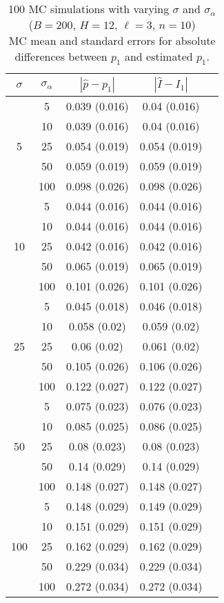 \documentclass[12pt]{article}
\theoremstyle{definition}
\theoremstyle{definition}
\begin{document}
\begin{table}
\caption{100 MC simulations  with varying $\sigma$ and $\sigma_{\alpha}$ ($B = 200$, $H = 12$, $\ell = 3$, $n=10$) \\ MC mean and standard errors for absolute differences between $p_1$ and estimated $p_1$.} 
  \begin{center}
    \begin{tabular}{ccccc}
     $\sigma$ & $\sigma_{\alpha}$ &  $|\hat{p}-p_1|$ & $|\hat{I}- I_1|$ \\[.15cm]  
     \hline 
   \multirow{5}{*}{5}  & 5  & 0.039 (0.016) & 0.04 (0.016) \\ 
     & 10  & 0.039 (0.016) & 0.04 (0.016) \\ 
     & 25  & 0.054 (0.019) & 0.054 (0.019) \\ 
     & 50  & 0.059 (0.019) & 0.059 (0.019) \\ 
     & 100  & 0.098 (0.026) & 0.098 (0.026) \\[.15cm]  
      \hline 
    \multirow{5}{*}{10}  & 5  & 0.044 (0.016) & 0.044 (0.016) \\ 
     & 10  & 0.044 (0.016) & 0.044 (0.016) \\ 
     & 25  & 0.042 (0.016) & 0.042 (0.016) \\ 
     & 50  & 0.065 (0.019) & 0.065 (0.019) \\ 
     & 100  & 0.101 (0.026) & 0.101 (0.026) \\[.15cm]  
      \hline 
    \multirow{5}{*}{25}  & 5  & 0.045 (0.018) & 0.046 (0.018) \\ 
     & 10  & 0.058 (0.02) & 0.059 (0.02) \\ 
     & 25  & 0.06 (0.02) & 0.061 (0.02) \\ 
     & 50  & 0.105 (0.026) & 0.106 (0.026) \\ 
     & 100  & 0.122 (0.027) & 0.122 (0.027) \\[.15cm]  
      \hline 
    \multirow{5}{*}{50}  & 5  & 0.075 (0.023) & 0.076 (0.023) \\ 
     & 10  & 0.085 (0.025) & 0.086 (0.025) \\ 
     & 25  & 0.08 (0.023) & 0.08 (0.023) \\ 
     & 50  & 0.14 (0.029) & 0.14 (0.029) \\ 
     & 100  & 0.148 (0.027) & 0.148 (0.027) \\[.15cm]  
      \hline 
    \multirow{5}{*}{100}  & 5  & 0.148 (0.029) & 0.149 (0.029) \\ 
    & 10  & 0.151 (0.029) & 0.151 (0.029) \\ 
     & 25  & 0.162 (0.029) & 0.162 (0.029) \\ 
     & 50  & 0.229 (0.034) & 0.229 (0.034) \\ 
     & 100  & 0.272 (0.034) & 0.272 (0.034) \\
    \end{tabular}
  \end{center}  
\end{table}
\end{document}
